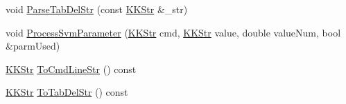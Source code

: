 \begin{DoxyCompactItemize}
\item 
void \hyperlink{struct_s_v_m233_1_1svm__parameter_a4f1419736814d5c7185dfc36ed331ea4}{Parse\+Tab\+Del\+Str} (const \hyperlink{class_k_k_b_1_1_k_k_str}{K\+K\+Str} \&\+\_\+str)
\item 
void \hyperlink{struct_s_v_m233_1_1svm__parameter_ab5a7c97ba6772210f6071400dfae48db}{Process\+Svm\+Parameter} (\hyperlink{class_k_k_b_1_1_k_k_str}{K\+K\+Str} cmd, \hyperlink{class_k_k_b_1_1_k_k_str}{K\+K\+Str} value, double value\+Num, bool \&parm\+Used)
\item 
\hyperlink{class_k_k_b_1_1_k_k_str}{K\+K\+Str} \hyperlink{struct_s_v_m233_1_1svm__parameter_a16ed3c65151a84ec701684e1e2941549}{To\+Cmd\+Line\+Str} () const 
\item 
\hyperlink{class_k_k_b_1_1_k_k_str}{K\+K\+Str} \hyperlink{struct_s_v_m233_1_1svm__parameter_a427fee117cc153048803a67e34d4d03f}{To\+Tab\+Del\+Str} () const 
\end{DoxyCompactItemize}
